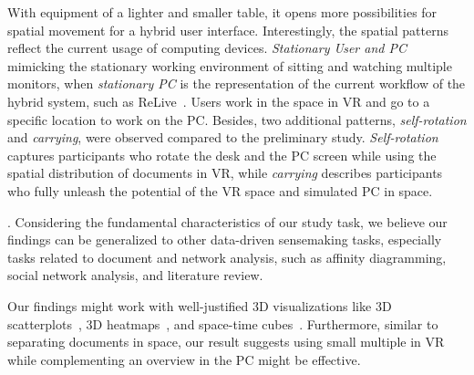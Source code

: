  With equipment of a lighter and smaller table, it opens more possibilities for spatial movement for a hybrid user interface. Interestingly, the spatial patterns reflect the current usage of computing devices. \textit{Stationary User and PC} mimicking the stationary working environment of sitting and watching multiple monitors, when \textit{stationary PC} is the representation of the current workflow of the hybrid system, such as ReLive~\cite{hubenschmid2022relive}. Users work in the space in VR and go to a specific location to work on the PC. Besides, two additional patterns, \textit{self-rotation} and \textit{carrying}, were observed compared to the preliminary study. \textit{Self-rotation} captures participants who rotate the desk and the PC screen while using the spatial distribution of documents in VR, while \textit{carrying} describes participants who fully unleash the potential of the VR space and simulated PC in space.  






. Considering the fundamental characteristics of our study task, we believe our findings can be generalized to other data-driven sensemaking tasks, especially tasks related to document and network analysis, such as affinity diagramming, social network analysis, and literature review. 

Our findings might work with well-justified 3D visualizations like 3D scatterplots~\cite{yang2020embodied}, 3D heatmaps~\cite{kraus2020assessing}, and space-time cubes~\cite{wagner2019evaluating}. 
Furthermore, similar to separating documents in space, our result suggests using small multiple in VR while complementing an overview in the PC might be effective.


